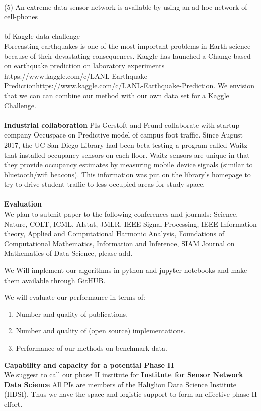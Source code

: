 \documentclass{article}
\begin{document}
\\
(5) An extreme data sensor network is available by using an ad-hoc network of cell-phones
\\
\\
{bf Kaggle data challenge}\\
Forecasting earthquakes is one of the most important problems in Earth science because of their devastating consequences. Kaggle has launched a Change based on earthquake prediction on laboratory experiments {https://www.kaggle.com/c/LANL-Earthquake-Prediction}{https://www.kaggle.com/c/LANL-Earthquake-Prediction}. We envision that we can can combine our method with our own data set for a Kaggle Challenge.  
\\
\\
{\bf Industrial collaboration}
PIs Gerstoft and Feund collaborate with startup company  Occuspace on
Predictive model of campus foot traffic. Since August 2017, the UC San Diego Library had been beta testing a program called Waitz that installed occupancy sensors on each floor. Waitz sensors are unique in that they provide occupancy estimates by measuring mobile device signals (similar to bluetooth/wifi beacons). This information was put on the library’s homepage to try to drive student traffic to less occupied areas for study space. 
\\
\\
{\bf Evaluation}\\
We plan to submit paper to the following conferences and journals:
Science, Nature, COLT, ICML, AIstat, JMLR, IEEE Signal Processing, IEEE Information
theory, Applied and Computational Harmonic Analysis, Foundations of Computational Mathematics, Information and Inference, SIAM Journal on Mathematics of Data Science, please add.

We Will implement our algorithms in python and jupyter notebooks and
make them available through GitHUB.


We will evaluate our performance in terms of:
\begin{enumerate}
\item Number and quality of publications.
\item Number  and quality of (open source) implementations.
\item Performance of our methods on benchmark data.
\end{enumerate}

\vspace{1cm}
{\bf Capability and capacity for a potential Phase II}\\
We suggest to call our phase II institute for {\bf Institute for  Sensor Network Data Science}
All PIs are members of the Haligliou Data Science Institute (HDSI). Thus we have the space and logistic support to form an effective phase II effort.
\end{document}
